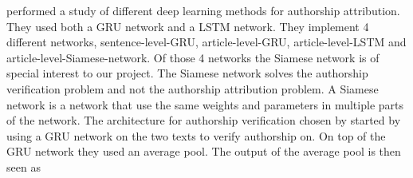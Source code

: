 \cite{qian:2018} performed a study of different deep learning methods for
authorship attribution. They used both a \gls{GRU} network and a \gls{LSTM}
network. They implement 4 different networks, sentence-level-\gls{GRU},
article-level-\gls{GRU}, article-level-\gls{LSTM} and
article-level-Siamese-network. Of those 4 networks the Siamese network is of
special interest to our project. The Siamese network solves the authorship
verification problem and not the authorship attribution problem. A Siamese
network is a network that use the same weights and parameters in multiple parts
of the network. The architecture for authorship verification chosen by
\cite{qian:2018} started by using a \gls{GRU} network on the two texts to verify
authorship on. On top of the \gls{GRU} network they used an average pool. The
output of the average pool is then seen as
